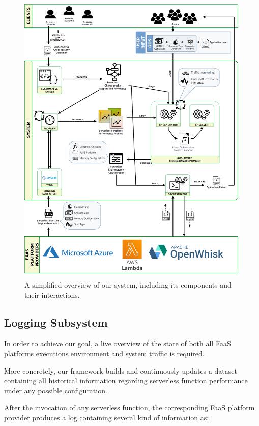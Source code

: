 \documentclass[12pt,a4paper]{report}
\begin{document}
\begin{figure}[h!]
	\centering
	\includegraphics[width=\textwidth, height=0.9\textheight]{./images/System.png}
	\caption{A simplified overview of our system, including its components and their interactions.}%
	\label{Overview}
\end{figure}

\subsection{Logging Subsystem}

In order to achieve our goal, a live overview of the state of both all FaaS platforms executions environment and system traffic is required.

More concretely, our framework builds and continuously updates a dataset containing all historical information regarding serverless function performance under any possible configuration.

After the invocation of any serverless function, the corresponding FaaS platform provider produces a log containing several kind of information as:   
\end{document}
